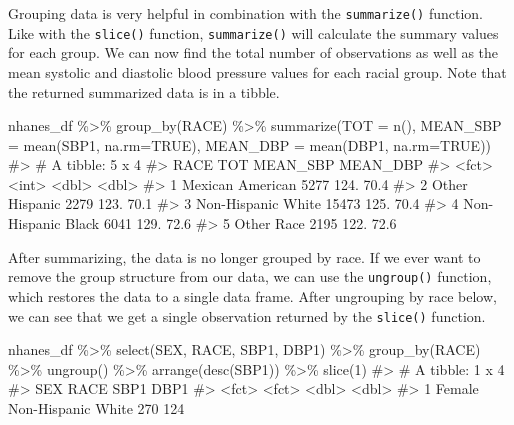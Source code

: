 \documentclass[
  letterpaper,
]{krantz}
\makeatletter
\newenvironment{Shaded}{\begin{snugshade}}{\end{snugshade}}
\newcommand{\AttributeTok}[1]{\textcolor[rgb]{0.40,0.45,0.13}{#1}}
\newcommand{\CommentTok}[1]{\textcolor[rgb]{0.37,0.37,0.37}{#1}}
\newcommand{\ConstantTok}[1]{\textcolor[rgb]{0.56,0.35,0.01}{#1}}
\newcommand{\DecValTok}[1]{\textcolor[rgb]{0.68,0.00,0.00}{#1}}
\newcommand{\FunctionTok}[1]{\textcolor[rgb]{0.28,0.35,0.67}{#1}}
\newcommand{\NormalTok}[1]{\textcolor[rgb]{0.00,0.23,0.31}{#1}}
\newcommand{\SpecialCharTok}[1]{\textcolor[rgb]{0.37,0.37,0.37}{#1}}
\newenvironment{kframe}{%
\medskip{}
\setlength{\fboxsep}{.8em}
 \def\at@end@of@kframe{}%
 \ifinner\ifhmode%
  \def\at@end@of@kframe{\end{minipage}}%
  \begin{minipage}{\columnwidth}%
 \fi\fi%
 \def\FrameCommand##1{\hskip\@totalleftmargin \hskip-\fboxsep
 \colorbox{shadecolor}{##1}\hskip-\fboxsep
     \hskip-\linewidth \hskip-\@totalleftmargin \hskip\columnwidth}%
 \MakeFramed {\advance\hsize-\width
   \@totalleftmargin\z@ \linewidth\hsize
   \@setminipage}}%
 {\par\unskip\endMakeFramed%
 \at@end@of@kframe}
\renewenvironment{Shaded}{\begin{kframe}}{\end{kframe}}
\makeatother
\begin{document}
Grouping data is very helpful in combination with the
\texttt{summarize()} function. Like with the \texttt{slice()} function,
\texttt{summarize()} will calculate the summary values for each group.
We can now find the total number of observations as well as the mean
systolic and diastolic blood pressure values for each racial group. Note
that the returned summarized data is in a tibble.

\begin{Shaded}
\begin{Highlighting}[]
\NormalTok{nhanes\_df }\SpecialCharTok{\%\textgreater{}\%} 
  \FunctionTok{group\_by}\NormalTok{(RACE) }\SpecialCharTok{\%\textgreater{}\%}
  \FunctionTok{summarize}\NormalTok{(}\AttributeTok{TOT =} \FunctionTok{n}\NormalTok{(), }\AttributeTok{MEAN\_SBP =} \FunctionTok{mean}\NormalTok{(SBP1, }\AttributeTok{na.rm=}\ConstantTok{TRUE}\NormalTok{), }
            \AttributeTok{MEAN\_DBP =} \FunctionTok{mean}\NormalTok{(DBP1, }\AttributeTok{na.rm=}\ConstantTok{TRUE}\NormalTok{))}
\CommentTok{\#\textgreater{} \# A tibble: 5 x 4}
\CommentTok{\#\textgreater{}   RACE                 TOT MEAN\_SBP MEAN\_DBP}
\CommentTok{\#\textgreater{}   \textless{}fct\textgreater{}              \textless{}int\textgreater{}    \textless{}dbl\textgreater{}    \textless{}dbl\textgreater{}}
\CommentTok{\#\textgreater{} 1 Mexican American    5277     124.     70.4}
\CommentTok{\#\textgreater{} 2 Other Hispanic      2279     123.     70.1}
\CommentTok{\#\textgreater{} 3 Non{-}Hispanic White 15473     125.     70.4}
\CommentTok{\#\textgreater{} 4 Non{-}Hispanic Black  6041     129.     72.6}
\CommentTok{\#\textgreater{} 5 Other Race          2195     122.     72.6}
\end{Highlighting}
\end{Shaded}

After summarizing, the data is no longer grouped by race. If we ever
want to remove the group structure from our data, we can use the
\texttt{ungroup()} function, which restores the data to a single data
frame. After ungrouping by race below, we can see that we get a single
observation returned by the \texttt{slice()} function.

\begin{Shaded}
\begin{Highlighting}[]
\NormalTok{nhanes\_df }\SpecialCharTok{\%\textgreater{}\%} 
  \FunctionTok{select}\NormalTok{(SEX, RACE, SBP1, DBP1) }\SpecialCharTok{\%\textgreater{}\%}
  \FunctionTok{group\_by}\NormalTok{(RACE) }\SpecialCharTok{\%\textgreater{}\%}
  \FunctionTok{ungroup}\NormalTok{() }\SpecialCharTok{\%\textgreater{}\%}
  \FunctionTok{arrange}\NormalTok{(}\FunctionTok{desc}\NormalTok{(SBP1)) }\SpecialCharTok{\%\textgreater{}\%}
  \FunctionTok{slice}\NormalTok{(}\DecValTok{1}\NormalTok{)}
\CommentTok{\#\textgreater{} \# A tibble: 1 x 4}
\CommentTok{\#\textgreater{}   SEX    RACE                SBP1  DBP1}
\CommentTok{\#\textgreater{}   \textless{}fct\textgreater{}  \textless{}fct\textgreater{}              \textless{}dbl\textgreater{} \textless{}dbl\textgreater{}}
\CommentTok{\#\textgreater{} 1 Female Non{-}Hispanic White   270   124}
\end{Highlighting}
\end{Shaded}
\end{document}
